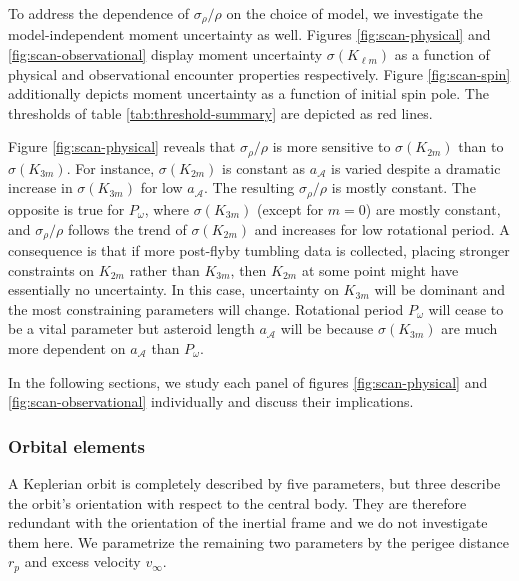 \documentclass[fleqn,usenatbib]{mnras}
\begin{document}
To address the dependence of $\sigma_\rho / \rho$ on the choice of model, we investigate the model-independent moment uncertainty as well. Figures \ref{fig:scan-physical} and \ref{fig:scan-observational} display moment uncertainty $\sigma(K_{\ell m})$ as a function of physical and observational encounter properties respectively. Figure \ref{fig:scan-spin} additionally depicts moment uncertainty as a function of initial spin pole. The thresholds of table \ref{tab:threshold-summary} are depicted as red lines. 

Figure \ref{fig:scan-physical} reveals that $\sigma_\rho / \rho$ is more sensitive to $\sigma (K_{2m})$ than to $\sigma(K_{3m})$. For instance, $\sigma(K_{2m})$ is constant as $a_\mathcal{A}$ is varied despite a dramatic increase in $\sigma(K_{3m})$ for low $a_\mathcal{A}$. The resulting $\sigma_\rho / \rho$ is mostly constant. The opposite is true for $P_\omega$, where $\sigma(K_{3m})$ (except for $m=0$) are mostly constant, and $\sigma_\rho /\rho$ follows the trend of $\sigma(K_{2m})$ and increases for low rotational period. A consequence is that if more post-flyby tumbling data is collected, placing stronger constraints on $K_{2m}$ rather than $K_{3m}$, then $K_{2m}$ at some point might have essentially no uncertainty. In this case, uncertainty on $K_{3m}$ will be dominant and the most constraining parameters will change. Rotational period $P_\omega$ will cease to be a vital parameter but asteroid length $a_\mathcal{A}$ will be because $\sigma(K_{3m})$ are much more dependent on $a_\mathcal{A}$ than $P_\omega$.

In the following sections, we study each panel of figures  \ref{fig:scan-physical} and \ref{fig:scan-observational} individually and discuss their implications.


\subsubsection{Orbital elements}
\label{sec:scan-orbit}
A Keplerian orbit is completely described by five parameters, but three describe the orbit's orientation with respect to the central body. They are therefore redundant with the orientation of the inertial frame and we do not investigate them here. We parametrize the remaining two parameters by the perigee distance $r_p$ and excess velocity $v_\infty$.
\end{document}
